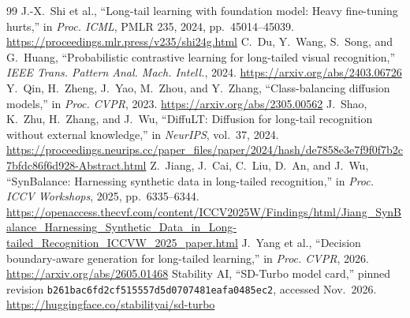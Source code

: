 \documentclass[conference]{IEEEtran}
\begin{document}
\begin{thebibliography}{99}
 J.-X.~Shi et al., ``Long-tail learning with foundation model: Heavy fine-tuning hurts,'' in \emph{Proc. ICML}, PMLR 235, 2024, pp.~45014--45039. \url{https://proceedings.mlr.press/v235/shi24g.html}
 C.~Du, Y.~Wang, S.~Song, and G.~Huang, ``Probabilistic contrastive learning for long-tailed visual recognition,'' \emph{IEEE Trans. Pattern Anal. Mach. Intell.}, 2024. \url{https://arxiv.org/abs/2403.06726}
 Y.~Qin, H.~Zheng, J.~Yao, M.~Zhou, and Y.~Zhang, ``Class-balancing diffusion models,'' in \emph{Proc. CVPR}, 2023. \url{https://arxiv.org/abs/2305.00562}
 J.~Shao, K.~Zhu, H.~Zhang, and J.~Wu, ``DiffuLT: Diffusion for long-tail recognition without external knowledge,'' in \emph{NeurIPS}, vol.~37, 2024. \url{https://proceedings.neurips.cc/paper_files/paper/2024/hash/de7858e3e7f9f0f7b2c7bfdc86f6d928-Abstract.html}
 Z.~Jiang, J.~Cai, C.~Liu, D.~An, and J.~Wu, ``SynBalance: Harnessing synthetic data in long-tailed recognition,'' in \emph{Proc. ICCV Workshops}, 2025, pp.~6335--6344. \url{https://openaccess.thecvf.com/content/ICCV2025W/Findings/html/Jiang_SynBalance_Harnessing_Synthetic_Data_in_Long-tailed_Recognition_ICCVW_2025_paper.html}
 J.~Yang et al., ``Decision boundary-aware generation for long-tailed learning,'' in \emph{Proc. CVPR}, 2026. \url{https://arxiv.org/abs/2605.01468}
 Stability AI, ``SD-Turbo model card,'' pinned revision \nolinkurl{b261bac6fd2cf515557d5d0707481eafa0485ec2}, accessed Nov.~2026. \url{https://huggingface.co/stabilityai/sd-turbo}

\end{thebibliography}

\clearpage
\onecolumn
\appendices
\end{document}
